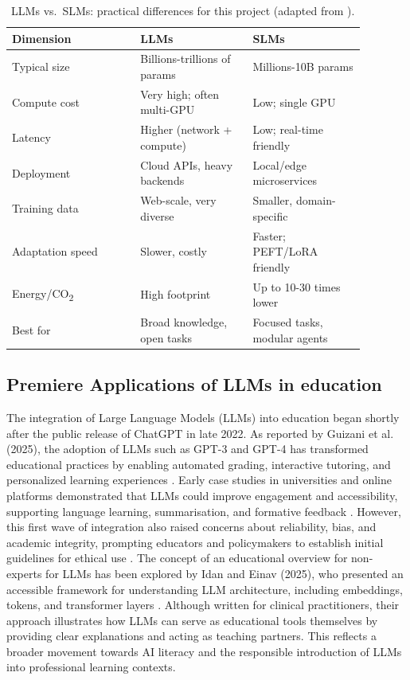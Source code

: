 \begin{table}[h]
\centering
\caption{LLMs vs.\ SLMs: practical differences for this project (adapted from \cite{LLMVsSLM66:online,SmallLan73:online}).}
\label{tab:llm-slm}
\begin{tabular}{p{0.32\linewidth} p{0.28\linewidth} p{0.28\linewidth}}
\toprule
\textbf{Dimension} & \textbf{LLMs} & \textbf{SLMs} \\ \midrule
Typical size & Billions-trillions of params & Millions-10B params \\
Compute cost & Very high; often multi-GPU & Low; single GPU \\
Latency & Higher (network + compute) & Low; real-time friendly \\
Deployment & Cloud APIs, heavy backends & Local/edge microservices \\
Training data & Web-scale, very diverse & Smaller, domain-specific \\
Adaptation speed & Slower, costly & Faster; PEFT/LoRA friendly \\
Energy/CO\textsubscript{2} & High footprint & Up to 10-30 times lower \\
Best for & Broad knowledge, open tasks & Focused tasks, modular agents \\
\bottomrule
\end{tabular}
\end{table}
\FloatBarrier

\subsection{Premiere Applications of LLMs in education}
The integration of Large Language Models (LLMs) into education began shortly after the public release of ChatGPT in late 2022. As reported by Guizani et al. (2025), the adoption of LLMs such as GPT-3 and GPT-4 has transformed educational practices by enabling automated grading, interactive tutoring, and personalized learning experiences \parencite{Asystema7:online}. Early case studies in universities and online platforms demonstrated that LLMs could improve engagement and accessibility, supporting language learning, summarisation, and formative feedback \parencite{ChatGPTf63:online}. However, this first wave of integration also raised concerns about reliability, bias, and academic integrity, prompting educators and policymakers to establish initial guidelines for ethical use \parencite{Untitled13:online, Practica79:online}. The concept of an educational overview for non-experts for LLMs has been explored by Idan and Einav (2025), who presented an accessible framework for understanding LLM architecture, including embeddings, tokens, and transformer layers \parencite{Primeron58:online}. Although written for clinical practitioners, their approach illustrates how LLMs can serve as educational tools themselves by providing clear explanations and acting as teaching partners. This reflects a broader movement towards AI literacy and the responsible introduction of LLMs into professional learning contexts.

